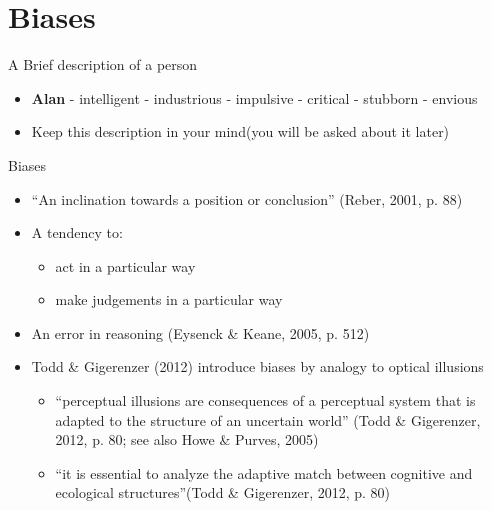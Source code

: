 \documentclass[
  ignorenonframetext,
]{beamer}
\providecommand{\tightlist}{%
  \setlength{\itemsep}{0pt}\setlength{\parskip}{0pt}}\usepackage{longtable,booktabs,array}
\begin{document}
\hypertarget{biases}{%
\section{Biases}\label{biases}}

\begin{frame}{A Brief description of a person}
\protect\hypertarget{a-brief-description-of-a-person}{}
\begin{itemize}
\tightlist
\item
  \textbf{Alan} - intelligent - industrious - impulsive - critical -
  stubborn - envious
\end{itemize}

\begin{itemize}
\tightlist
\item
  Keep this description in your mind(you will be asked about it later)
\end{itemize}
\end{frame}

\begin{frame}{Biases}
\protect\hypertarget{biases-1}{}
\begin{itemize}
\item
  ``An inclination towards a position or conclusion'' (Reber, 2001, p.
  88)
\item
  A tendency to:

  \begin{itemize}
  \tightlist
  \item
    act in a particular way
  \item
    make judgements in a particular way
  \end{itemize}
\item
  An error in reasoning (Eysenck \& Keane, 2005, p. 512)
\item
  Todd \& Gigerenzer (2012) introduce biases by analogy to optical
  illusions

  \begin{itemize}
  \tightlist
  \item
    ``perceptual illusions are consequences of a perceptual system that
    is adapted to the structure of an uncertain world'' (Todd \&
    Gigerenzer, 2012, p. 80; see also Howe \& Purves, 2005)
  \item
    ``it is essential to analyze the adaptive match between cognitive
    and ecological structures''(Todd \& Gigerenzer, 2012, p. 80)
  \end{itemize}
\end{itemize}
\end{frame}
\end{document}
